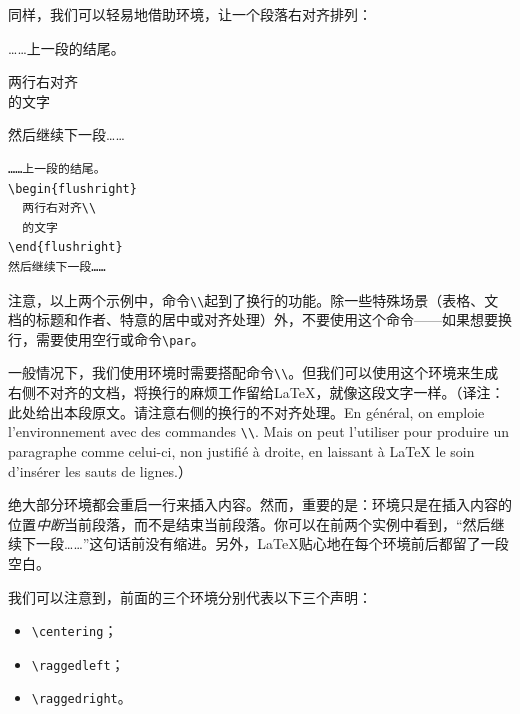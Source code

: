 同样，我们可以轻易地借助环境，让一个段落右对齐排列：

\begin{codelist}[2.6]{
    ……上一段的结尾。
    \begin{flushright}
      两行右对齐\\
      的文字
    \end{flushright}
    然后继续下一段……
    }
\begin{verbatim}
……上一段的结尾。
\begin{flushright}
  两行右对齐\\
  的文字
\end{flushright}
然后继续下一段……\end{verbatim}
\end{codelist}

注意，以上两个示例中，命令\verb|\\|起到了换行的功能。除一些特殊场景（表格、文档的标题和作者、特意的居中或对齐处理）外，不要使用这个命令——如果想要换行，需要使用空行或命令\verb|\par|。

\begin{flushleft}
    一般情况下，我们使用环境时需要搭配命令\verb|\\|。但我们可以使用这个环境来生成右侧不对齐的文档，将换行的麻烦工作留给\LaTeX ，就像这段文字一样。（译注：此处给出本段原文。请注意右侧的换行的不对齐处理。En général, on emploie l'environnement  avec des commandes \verb|\\|. Mais on peut l'utiliser pour produire un paragraphe comme celui-ci, non justifié à droite, en laissant à \LaTeX{} le soin d’insérer les sauts de lignes.）
\end{flushleft}

\begin{exclamation}
    绝大部分环境都会重启一行来插入内容。然而，重要的是：环境只是在插入内容的位置\emph{中断}当前段落，而不是结束当前段落。你可以在前两个实例中看到，“然后继续下一段……”这句话前没有缩进。另外，\LaTeX 贴心地在每个环境前后都留了一段空白。
\end{exclamation}

我们可以注意到，前面的三个环境分别代表以下三个声明：

\begin{itemize}
    \item \verb|\centering|；
    \item \verb|\raggedleft|；
    \item \verb|\raggedright|。
\end{itemize}

